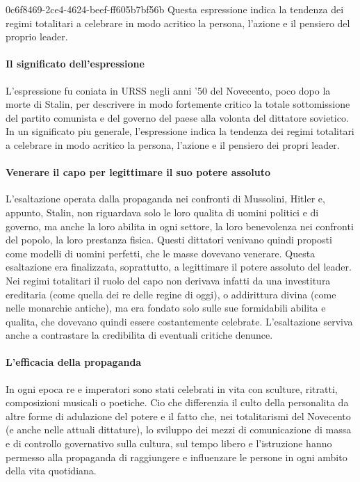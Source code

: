 \documentclass[preview]{standalone}
\begin{document}
\begin{snippet}{0c6f8469-2ce4-4624-beef-ff605b7bf56b}
    Questa espressione indica la tendenza dei regimi totalitari
    a celebrare in modo acritico la persona, l'azione e il pensiero del proprio leader.

    \paragraph*{Il significato dell'espressione}
    L'espressione  fu coniata in URSS negli anni '50 del Novecento, poco
    dopo la morte di Stalin, per descrivere in modo fortemente critico la totale sottomissione del
    partito comunista e del governo del paese alla volonta del dittatore sovietico. In un significato
    piu generale, l'espressione indica la tendenza dei regimi totalitari a celebrare in modo acritico
    la persona, l'azione e il pensiero dei propri leader.

    \paragraph*{Venerare il capo per legittimare il suo potere assoluto}
    L'esaltazione operata dalla propaganda nei confronti di Mussolini, Hitler e, appunto, Stalin, non
    riguardava solo le loro qualita di uomini politici e di governo, ma anche la loro abilita in ogni
    settore, la loro benevolenza nei confronti del popolo, la loro prestanza fisica. Questi dittatori
    venivano quindi proposti come modelli di uomini perfetti, che le masse dovevano venerare.
    Questa esaltazione era finalizzata, soprattutto, a legittimare il potere assoluto del leader. Nei
    regimi totalitari il ruolo del capo non derivava infatti da una investitura ereditaria (come quella
    dei re delle regine di oggi), o addirittura divina (come nelle monarchie antiche), ma era fondato
    solo sulle sue formidabili abilita e qualita, che dovevano quindi essere costantemente celebrate.
    L'esaltazione serviva anche a contrastare la credibilita di eventuali critiche denunce.

    \paragraph*{L'efficacia della propaganda}
    In ogni epoca re e imperatori sono stati celebrati in vita con sculture, ritratti, composizioni
    musicali o poetiche. Cio che differenzia il culto della personalita da altre forme di adulazione
    del potere e il fatto che, nei totalitarismi del Novecento (e anche nelle attuali dittature), lo
    sviluppo dei mezzi di comunicazione di massa e di controllo governativo sulla cultura, sul tempo
    libero e l'istruzione hanno permesso alla propaganda di raggiungere e influenzare le persone
    in ogni ambito della vita quotidiana.
\end{snippet}

\end{document}
